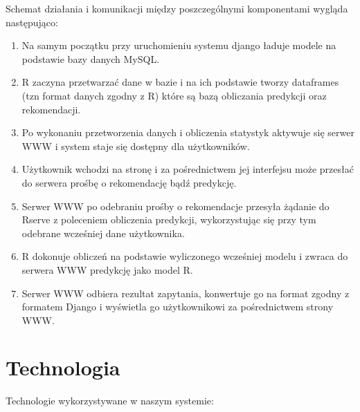 \documentclass[licencjacka]{pracamgr}
\begin{document}
Schemat działania i komunikacji między poszczególnymi komponentami wygląda następująco:
\begin{enumerate}

\item Na samym początku przy uruchomieniu systemu django ładuje modele na podstawie bazy danych MySQL.

\item R zaczyna przetwarzać dane w bazie i na ich podstawie tworzy dataframes (tzn format danych zgodny z R) które są bazą obliczania predykcji oraz rekomendacji.

\item Po wykonaniu przetworzenia danych i obliczenia statystyk aktywuje się serwer WWW i system staje się dostępny dla użytkowników.

\item Użytkownik wchodzi na stronę i za pośrednictwem jej interfejsu może przesłać do serwera prośbę o rekomendację bądź predykcję.

\item Serwer WWW po odebraniu prośby o rekomendacje przesyła żądanie do Rserve z poleceniem obliczenia predykcji, wykorzystując się przy tym odebrane wcześniej dane użytkownika.

\item R dokonuje obliczeń na podstawie wyliczonego wcześniej modelu i zwraca do serwera WWW predykcję jako model R.

\item Serwer WWW odbiera rezultat zapytania, konwertuje go na format zgodny z formatem Django i wyświetla go użytkownikowi za pośrednictwem strony WWW.

\end{enumerate}


 \chapter{Technologia}
Technologie wykorzystywane w naszym systemie: \par
\end{document}
